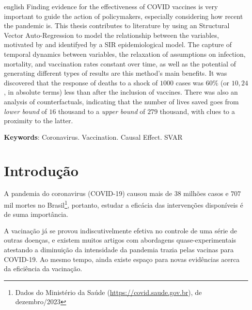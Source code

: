 \documentclass[
    article,
	12pt,				%
	oneside,			%
	a4paper,			%
	english,			%
	brazil,				%
	hyperref = {colorlinks, citecolor=c1d, linkcolor=c2d, urlcolor=c3d, colorlinks}
	]{abntex2}
\newcounter{j}
\begin{document}
\newpage
\begin{resumo}[Abstract]
\begin{otherlanguage*}{english}
   Finding evidence for the effectiveness of COVID vaccines is very important to guide the action of policymakers, especially considering how recent the pandemic is. This thesis contributes to literature by using an Structural Vector Auto-Regression to model the relationship between the variables, motivated by and identifyed by a SIR epidemiological model. The capture of temporal dynamics between variables, the relaxation of assumptions on infection, mortality, and vaccination rates constant over time, as well as the potential of generating different types of results are this method’s main benefits. It was discovered that the response of deaths to a shock of $1000$ cases was $60$\% (or $10,24$, in absolute terms) less than after the inclusion of vaccines. There was also an analysis of counterfactuals, indicating that the number of lives saved goes from \textit{lower bound} of $16$ thousand to a \textit{upper bound} of $279$ thousand, with clues to a proximity to the latter.

   \vspace{\onelineskip}
 
   \noindent 
   \textbf{Keywords}: Coronavirus. Vaccination. Causal Effect. SVAR
\end{otherlanguage*}
\end{resumo}


\newpage
\tableofcontents*
\cleardoublepage


\textual
\pagestyle{plain} %

\chapter{Introdução}
A pandemia do coronavirus (COVID-19) causou mais de $38$ milhões casos e $707$ mil mortes no Brasil\footnote{Dados do Ministério da Saúde (\url{https://covid.saude.gov.br}), de dezembro/2023}, portanto, estudar a eficácia das intervenções disponíveis é de suma importância.

A vacinação já se provou indiscutivelmente efetiva no controle de uma série de outras doenças, e existem muitos artigos com abordagens quase-experimentais atestando a diminuição da intensidade da pandemia trazia pelas vacinas para COVID-19. Ao mesmo tempo, ainda existe espaço para novas evidências acerca da eficiência da vacinação.
\end{document}
